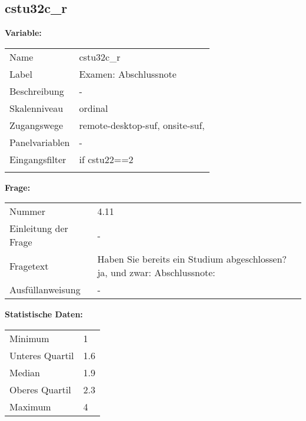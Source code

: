 	
	
	\subsection{cstu32c\_r}
	\label{subSection:cstu32c_r}

	\noindent\textbf{Variable:}\\
		\begin{tabular}{lL{11.3cm}}
			\label{tableVariable:cstu32c_r}
			Name & cstu32c\_r \\
			Label & Examen: Abschlussnote \\
			Beschreibung & - \\
			Skalenniveau & ordinal \\
			Zugangswege &
				remote-desktop-suf,
				onsite-suf,
 \\
			Panelvariablen & -
			 \\
			Eingangsfilter & if cstu22==2 \\
 \\
		\end{tabular}

		\vspace*{1 cm}
		\noindent\textbf{Frage:}\\
		\begin{tabular}{lL{11.3cm}}
			\label{tableQuestion:cstu32c_r}
			Nummer & 4.11 \\
			Einleitung der Frage & - \\
			Fragetext & Haben Sie bereits ein Studium abgeschlossen?
ja, und zwar:
Abschlussnote: \\
			Ausfüllanweisung & - \\
		\end{tabular}


		\vspace*{1 cm}
		\noindent\textbf{Statistische Daten:}\\
			\begin{tabular}{ll}
				\label{tableStatistics:cstu32c_r}
					Minimum & 1 \\
					Unteres Quartil & 1.6 \\
					Median & 1.9 \\
					Oberes Quartil & 2.3 \\
					Maximum & 4 \\
			\end{tabular}



